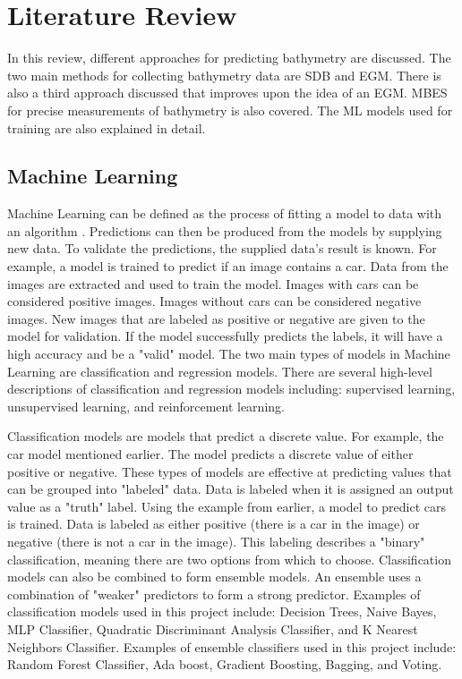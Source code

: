 \section{Literature Review}
\setlength{\parindent}{10ex}
In this review, different approaches for predicting bathymetry are discussed.
The two main methods for collecting bathymetry data are \ac{SDB} and \ac{EGM}.
There is also a third approach discussed that improves upon the idea of an \ac{EGM}.
\ac{MBES} for precise measurements of bathymetry \cite{farr1980multibeam} is also covered.
The \ac{ML} models used for training are also explained in detail.

\subsection{Machine Learning}
Machine Learning can be defined as the process of fitting a model to data with an algorithm \cite{bishop2006pattern}.
Predictions can then be produced from the models by supplying new data.
To validate the predictions, the supplied data's result is known.
For example, a model is trained to predict if an image contains a car.
Data from the images are extracted and used to train the model.
Images with cars can be considered positive images.
Images without cars can be considered negative images.
New images that are labeled as positive or negative are given to the model for validation.
If the model successfully predicts the labels, it will have a high accuracy and be a "valid" model.
The two main types of models in Machine Learning are classification and regression models.
There are several high-level descriptions of classification and regression models including: supervised learning, unsupervised learning, and reinforcement learning.

\par
Classification models are models that predict a discrete value.
For example, the car model mentioned earlier.
The model predicts a discrete value of either positive or negative.
These types of models are effective at predicting values that can be grouped into "labeled" data.
Data is labeled when it is assigned an output value as a "truth" label.
Using the example from earlier, a model to predict cars is trained.
Data is labeled as either positive (there is a car in the image) or negative (there is not a car in the image).
This labeling describes a "binary" classification, meaning there are two options from which to choose.
Classification models can also be combined to form ensemble models.
An ensemble uses a combination of "weaker" predictors to form a strong predictor.
Examples of classification models used in this project include: Decision Trees, Naive Bayes, MLP Classifier, Quadratic Discriminant Analysis Classifier, and K Nearest Neighbors Classifier.
Examples of ensemble classifiers used in this project include: Random Forest Classifier, Ada boost, Gradient Boosting, Bagging, and Voting.

